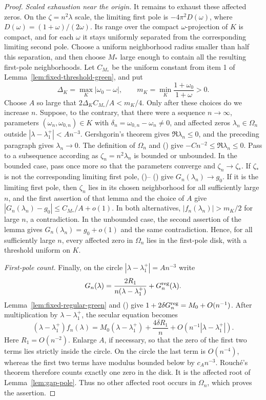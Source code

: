 \documentclass[twoside,10pt]{article}
\numberwithin{equation}{section}
\theoremstyle{slbody}
\theoremstyle{definition}
\theoremstyle{remark}
\renewcommand{\eqref}[1]{%
  \textup{{\normalfont(\oldstylenums{\ref{#1}}}\normalfont)}}
\begin{document}
\begin{proof}
\smallskip
\noindent\emph{Scaled exhaustion near the origin.}
It remains to exhaust these affected zeros.  On the
$\zeta=n^2\lambda$ scale, the limiting first pole is
$-4\pi^2D(\omega)$, where $D(\omega)=(1+\omega)/(2\omega)$.  Its range
over the compact $\omega$-projection of
$K$ is compact, and for each $\omega$ it stays uniformly separated from
the corresponding limiting second pole.  Choose a uniform neighborhood
radius smaller than half this separation, and then choose $M_*$ large
enough to contain all the resulting first-pole neighborhoods.  Let
$C_{M_*}$ be the uniform constant
from item 1 of Lemma~\ref{lem:fixed-threshold-green}, and put
\[
 \Delta_K=\max_K|\omega_0-\omega|,
 \qquad m_K=\min_K\frac{1+\omega_0}{1+\omega}>0.
\]
Choose $A$ so large that $2\Delta_KC_{M_*}/A<m_K/4$.  Only after these
choices do we increase $n$.
Suppose, to the contrary, that there were a sequence $n\to\infty$,
parameters $(\omega_n,\omega_{0,n})\in K$ with
$\delta_n=\omega_{0,n}-\omega_n\ne0$, and
affected zeros $\lambda_n\in\Omega_n$ outside
$|\lambda-\lambda_1^+|<A n^{-3}$.  Gershgorin's theorem gives
$\Re\lambda_n\le0$, and the preceding paragraph gives $\lambda_n\to0$.
The definition of $\Omega_n$ and \eqref{eq:slow-dispersion-bound} give
$-C n^{-2}\le\Re\lambda_n\le0$.  Pass to a subsequence according as
$\zeta_n=n^2\lambda_n$ is bounded or unbounded.
In the bounded case, pass once more so that the parameters converge and
$\zeta_n\to\zeta_*$.  If $\zeta_*$ is not the corresponding limiting
first pole,
\eqref{eq:fixed-threshold-green-expanded}--\eqref{eq:coth-distance-bound}
give $G_n(\lambda_n)\to g_0$.
If it is the limiting first pole, then $\zeta_n$ lies in its chosen
neighborhood for all sufficiently large $n$, and the first assertion of
that lemma and the choice of $A$ give
$|G_n(\lambda_n)-g_0|\le C_{M_*}/A+o(1)$.  In both alternatives,
$|f_n(\lambda_n)|>m_K/2$ for large $n$, a contradiction.  In the
unbounded case, the second assertion of the lemma gives
$G_n(\lambda_n)=g_0+o(1)$ and the same contradiction.  Hence, for all
sufficiently large $n$, every affected zero in $\Omega_n$ lies in the
first-pole disk, with a threshold uniform on $K$.

\smallskip
\noindent\emph{First-pole count.}
Finally, on the circle $|\lambda-\lambda_1^+|=A n^{-3}$ write
\[
 G_n(\lambda)=\frac{2R_1}{n(\lambda-\lambda_1^+)}
                 +G_n^{\rm reg}(\lambda).
\]
Lemma~\ref{lem:fixed-regular-green} and
\eqref{eq:threshold-secular-margin} give
$1+2\delta G_n^{\rm reg}=M_0+O(n^{-1})$.  After multiplication by
$\lambda-\lambda_1^+$, the secular equation becomes
\begin{equation}\label{eq:fixed-first-pole-rouche}
 (\lambda-\lambda_1^+)f_n(\lambda)
 =M_0(\lambda-\lambda_1^+)+\frac{4\delta R_1}{n}
   +O(n^{-1}|\lambda-\lambda_1^+|).
\end{equation}
Here $R_1=O(n^{-2})$.  Enlarge $A$, if necessary, so that the zero of
the first two terms lies strictly inside the circle.  On the circle the
last term is $O(n^{-4})$, whereas the first two terms have modulus
bounded below by $c_A n^{-3}$.  Rouch\'e's theorem therefore counts
exactly one zero in the disk.  It is the affected root of
Lemma~\ref{lem:gap-pole}.  Thus no other affected root occurs in $\Omega_n$,
which proves the assertion.


\end{proof}
\end{document}
